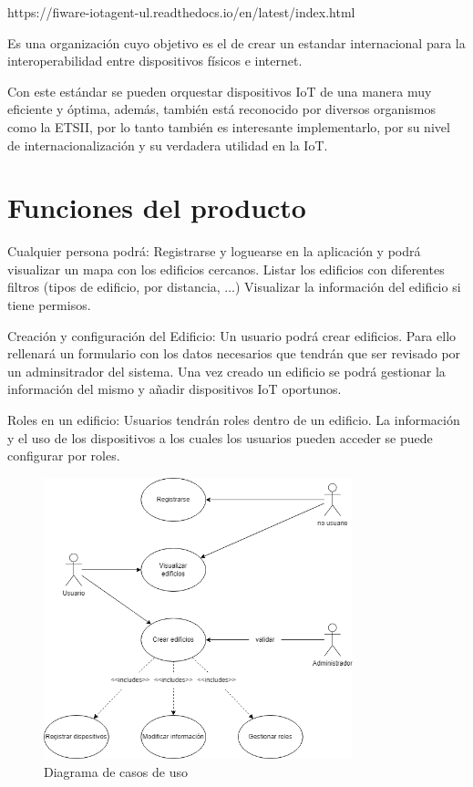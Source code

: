 \documentclass[12pt, a4paper, twoside]{article}
\begin{document}
https://fiware-iotagent-ul.readthedocs.io/en/latest/index.html

Es una organización cuyo objetivo es el de crear un estandar internacional para la interoperabilidad
entre dispositivos físicos e internet.

Con este estándar se pueden orquestar dispositivos IoT de una manera muy eficiente y óptima, además,
también está reconocido por diversos organismos como la ETSII, por lo tanto también es interesante
implementarlo, por su nivel de internacionalización y su verdadera utilidad en la IoT.

\section{Funciones del producto}
Cualquier persona podrá:
 Registrarse y loguearse en la aplicación y podrá visualizar un mapa con los edificios cercanos.
 Listar los edificios con diferentes filtros (tipos de edificio, por distancia, ...)
 Visualizar la información del edificio si tiene permisos.

Creación y configuración del Edificio:
 Un usuario podrá crear edificios. Para ello rellenará un formulario con los datos necesarios que
 tendrán que ser revisado por un adminsitrador del sistema.
 Una vez creado un edificio se podrá gestionar la información del mismo y añadir dispositivos IoT oportunos.

Roles en un edificio:
 Usuarios tendrán roles dentro de un edificio. La información y el uso de los dispositivos a los cuales
 los usuarios pueden acceder se puede configurar por roles.

\begin{figure}[h]
  \centering
  \includegraphics[width=0.8\textwidth]{UserCase.0.1.png}
  \caption{Diagrama de casos de uso}
\end{figure}
\end{document}
